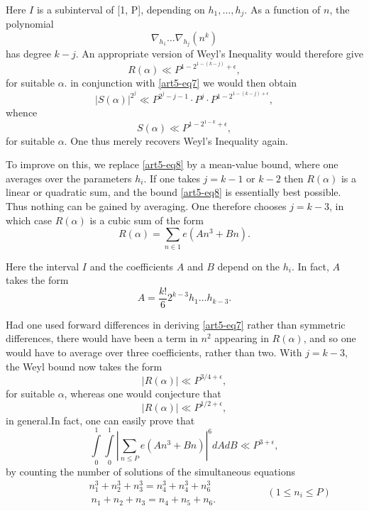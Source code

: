 Here $I$ is a subinterval of [1, P], depending on $h_1, \ldots, h_j$. As a function of $n$, the polynomial
$$
\nabla_{h_1}\ldots \nabla_{h_j} (n^k)
$$
has degree $k-j$. An appropriate version of Weyl's Inequality would therefore give
\begin{equation}
R (\alpha) \ll P^{1-2^{1-(k-j)} +\epsilon}, \label{art5-eq8}
\end{equation}
for suitable $\alpha$. in conjunction with \eqref{art5-eq7} we would then obtain
$$
|S(\alpha)|^{2^j} \ll P^{2^j -j -1}\cdot P^j \cdot P^{1-2^{1-(k-j)+\epsilon}},
$$
whence
$$
S(\alpha) \ll P^{1-2^{1-k} + \epsilon},
$$
for suitable $\alpha$. One thus merely recovers Weyl's Inequality again.

To improve on this, we replace \eqref{art5-eq8} by a mean-value bound, where one averages over the parameters $h_i$. If one takes $j=k-1$ or $k-2$ then $R(\alpha)$ is a linear or quadratic sum, and the bound \eqref{art5-eq8} is essentially best possible. Thus nothing can be gained by averaging. One therefore chooses $j=k-3$, in which case $R(\alpha)$ is a cubic sum of the form
$$
R(\alpha) = \sum\limits_{n\in 1} e (An^3 + Bn).
$$

Here the interval $I$ and the coefficients $A$ and $B$ depend on the $h_i$. In fact, $A$ takes the form 
$$
A = \frac{k!}{6} 2^{k-3} h_1 \ldots h_{k-3}.
$$

Had one used forward differences in deriving \eqref{art5-eq7} rather than symmetric differences, there would have been a term in $n^2$ appearing in $R(\alpha)$, and so one would have to average over three coefficients, rather than two. With  $j=k-3$, the Weyl bound now takes the form
\begin{equation}
|R(\alpha)| \ll P^{3/4+\epsilon} , \label{art5-eq9}
\end{equation}
for suitable $\alpha$, whereas one would conjecture that
$$
|R(\alpha)| \ll P^{1/2+\epsilon},
$$
in general.\pageoriginale In fact, one can easily prove that
\begin{equation}
\int\limits^1_0 \int\limits^1_0 |\sum\limits_{n \leqslant P} e(An^3+ Bn)|^6 d A d B \ll P^{3+\epsilon}, 
\label{art5-eq10}
\end{equation}
by counting the number of solutions of the simultaneous equations
\begin{equation*}
\hspace{2cm} 
\begin{matrix}
n^3_1 + n^3_2 + n^3_3 = n^3_4 + n^3_4 + n^3_6\\
~n_1 + n_2 + n_3 = n_4 + n_5 + n_6. 
\end{matrix} \hspace{2cm} (1\leqslant n_i \leqslant P)
\end{equation*}

